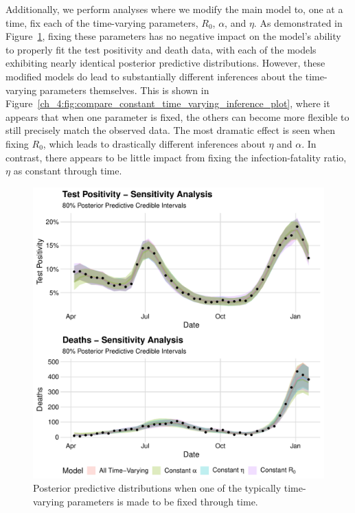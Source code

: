 Additionally, we perform analyses where we modify the main model to, one at a time, fix each of the time-varying parameters, \( R_0 \), \( \alpha \), and \( \eta \).
As demonstrated in Figure~\ref{ch_4:fig:compare_constant_time_varying_posterior_predictive_plot}, fixing these parameters has no negative impact on the model's ability to properly fit the test positivity and death data, with each of the models exhibiting nearly identical posterior predictive distributions.
However, these modified models do lead to substantially different inferences about the time-varying parameters themselves.
This is shown in Figure~\ref{ch_4:fig:compare_constant_time_varying_inference_plot}, where it appears that when one parameter is fixed, the others can become more flexible to still precisely match the observed data.
The most dramatic effect is seen when fixing \( R_0 \), which leads to drastically different inferences about \( \eta \) and \( \alpha \).
In contrast, there appears to be little impact from fixing the infection-fatality ratio, \( \eta \) as constant through time.

\begin{figure}[htbp]
    \centering
    \includegraphics[width=1.0\columnwidth]{compare_constant_time_varying_posterior_predictive_plot}
    \caption{Posterior predictive distributions when one of the typically time-varying parameters is made to be fixed through time.}
    \label{ch_4:fig:compare_constant_time_varying_posterior_predictive_plot}
\end{figure}


